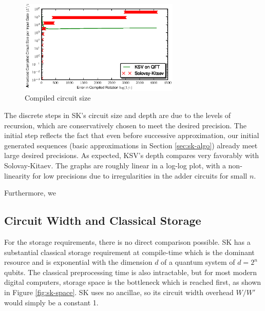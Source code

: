 \begin{center}
\begin{figure}[h!]
\includegraphics[width=3in]{figures/ksv-size.eps}
\caption{Compiled circuit size}
\label{fig:size}
\end{figure}
\end{center}

The discrete steps in SK's circuit size and depth are due
to the levels of recursion, which are conservatively chosen to meet
the desired precision. The initial step reflects the fact that even
before successive approximation, our initial generated sequences
(basic approximations in Section \ref{sec:sk-algo}) already meet large
desired precisions. As expected, KSV's depth compares very
favorably with Solovay-Kitaev.
The graphs are roughly linear in a log-log plot, with a non-linearity
for low precisions due to irregularities in the adder circuits for small
$n$.

Furthermore, we 

\subsection{Circuit Width and Classical Storage}
\label{subsec:results-width}

For the storage requirements, there is no direct comparison possible.
SK has a substantial classical storage requirement
at compile-time which is the dominant resource and is exponential with
the dimension $d$ of a quantum system of $d=2^n$ qubits.
The classical preprocessing time is
also intractable, but for most modern digital computers, storage space is the
bottleneck which is reached first, as shown in Figure \ref{fig:sk-space}.
SK uses no ancillae, so its circuit width overhead $W/W'$ would simply be
a constant 1.


